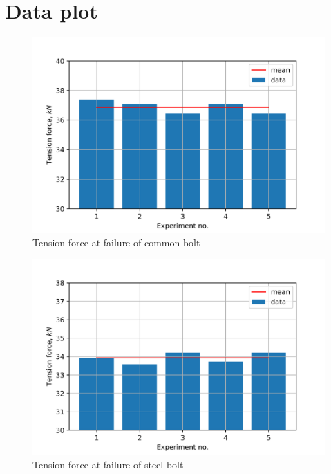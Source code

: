 \section{Data plot}
\begin{figure}[ht]
	\centering
	\includegraphics[width=140mm]{Exp2cb.png}
	\caption{Tension force at failure of common bolt}
\end{figure}
\begin{figure}[ht]
	\centering
	\includegraphics[width=140mm]{Exp2sb.png}
	\caption{Tension force at failure of steel bolt}
\end{figure}
%
